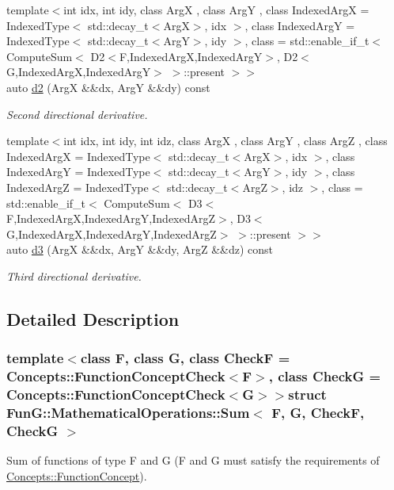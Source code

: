 \begin{DoxyCompactItemize}
{\footnotesize template$<$int idx, int idy, class Arg\-X , class Arg\-Y , class Indexed\-Arg\-X  = Indexed\-Type$<$ std\-::decay\-\_\-t$<$\-Arg\-X$>$, idx $>$, class Indexed\-Arg\-Y  = Indexed\-Type$<$ std\-::decay\-\_\-t$<$\-Arg\-Y$>$, idy $>$, class  = std\-::enable\-\_\-if\-\_\-t$<$ Compute\-Sum$<$ D2$<$\-F,\-Indexed\-Arg\-X,\-Indexed\-Arg\-Y$>$, D2$<$\-G,\-Indexed\-Arg\-X,\-Indexed\-Arg\-Y$>$ $>$\-::present $>$$>$ }\\auto \hyperlink{structFunG_1_1MathematicalOperations_1_1Sum_a2852f378176e93564ad85fa39331e21d}{d2} (Arg\-X \&\&dx, Arg\-Y \&\&dy) const 
\begin{DoxyCompactList}\small\item\em Second directional derivative. \end{DoxyCompactList}\item 
{\footnotesize template$<$int idx, int idy, int idz, class Arg\-X , class Arg\-Y , class Arg\-Z , class Indexed\-Arg\-X  = Indexed\-Type$<$ std\-::decay\-\_\-t$<$\-Arg\-X$>$, idx $>$, class Indexed\-Arg\-Y  = Indexed\-Type$<$ std\-::decay\-\_\-t$<$\-Arg\-Y$>$, idy $>$, class Indexed\-Arg\-Z  = Indexed\-Type$<$ std\-::decay\-\_\-t$<$\-Arg\-Z$>$, idz $>$, class  = std\-::enable\-\_\-if\-\_\-t$<$ Compute\-Sum$<$ D3$<$\-F,\-Indexed\-Arg\-X,\-Indexed\-Arg\-Y,\-Indexed\-Arg\-Z$>$, D3$<$\-G,\-Indexed\-Arg\-X,\-Indexed\-Arg\-Y,\-Indexed\-Arg\-Z$>$ $>$\-::present $>$$>$ }\\auto \hyperlink{structFunG_1_1MathematicalOperations_1_1Sum_a03b4ee4cb48bf45992bef43322982635}{d3} (Arg\-X \&\&dx, Arg\-Y \&\&dy, Arg\-Z \&\&dz) const 
\begin{DoxyCompactList}\small\item\em Third directional derivative. \end{DoxyCompactList}\end{DoxyCompactItemize}


\subsection{Detailed Description}
\subsubsection*{template$<$class F, class G, class Check\-F = Concepts\-::\-Function\-Concept\-Check$<$\-F$>$, class Check\-G = Concepts\-::\-Function\-Concept\-Check$<$\-G$>$$>$struct Fun\-G\-::\-Mathematical\-Operations\-::\-Sum$<$ F, G, Check\-F, Check\-G $>$}

Sum of functions of type F and G (F and G must satisfy the requirements of \hyperlink{structFunG_1_1Concepts_1_1FunctionConcept}{Concepts\-::\-Function\-Concept}). 

